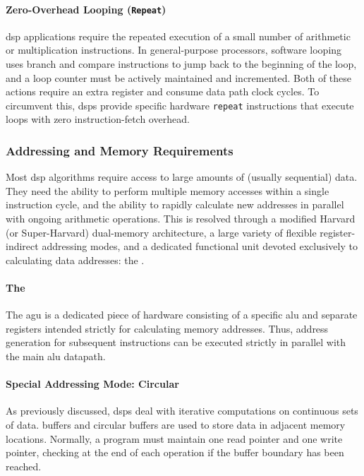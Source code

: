 \paragraph{Zero-Overhead Looping (\texttt{Repeat})} 
\gls{dsp} applications require the repeated execution of a small number of arithmetic or multiplication instructions. In general-purpose processors, software looping uses branch and compare instructions to jump back to the beginning of the loop, and a loop counter must be actively maintained and incremented. Both of these actions require an extra register and consume data path clock cycles. To circumvent this, \glspl{dsp} provide specific hardware \texttt{repeat} instructions that execute loops with zero instruction-fetch overhead.

\subsubsection{Addressing and Memory Requirements} 
Most \gls{dsp} algorithms require access to large amounts of (usually sequential) data. They need the ability to perform multiple memory accesses within a single instruction cycle, and the ability to rapidly calculate new addresses in parallel with ongoing arithmetic operations. This is resolved through a modified Harvard (or Super-Harvard) dual-memory architecture, a large variety of flexible register-indirect addressing modes, and a dedicated functional unit devoted exclusively to calculating data addresses: the .

\paragraph{The }
The \gls{agu} is a dedicated piece of hardware consisting of a specific \gls{alu} and separate registers intended strictly for calculating memory addresses. Thus, address generation for subsequent instructions can be executed strictly in parallel with the main \gls{alu} datapath.


\paragraph{Special Addressing Mode: Circular}
As previously discussed, \glspl{dsp} deal with iterative computations on continuous sets of data.  buffers and circular buffers are used to store data in adjacent memory locations. Normally, a program must maintain one read pointer and one write pointer, checking at the end of each operation if the buffer boundary has been reached.

